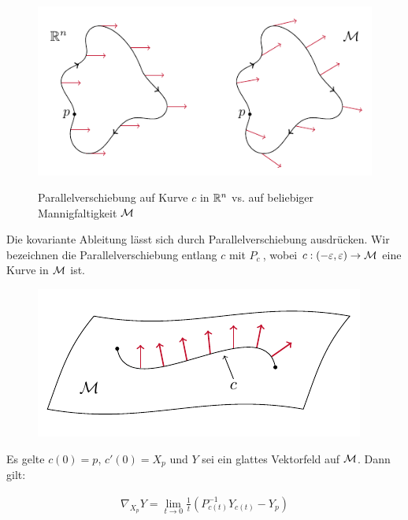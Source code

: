
\begin{figure}[H]
\centering
\includegraphics[width=0.7\linewidth]{figures/tikz/parallelshift_rn_vs_manifold.pdf}
\label{img:parallelshift_rn_vs_manifold}
\caption{Parallelverschiebung auf Kurve $c$ in $\mathbb{R}^n$ vs. auf beliebiger Mannigfaltigkeit $\mathcal{M}$}
\end{figure} 

Die kovariante Ableitung lässt sich durch Parallelverschiebung ausdrücken.
Wir bezeichnen die Parallelverschiebung entlang $c$ mit $P_c \ $, wobei $c: (-\varepsilon , \varepsilon) \to \mathcal{M}$ eine Kurve in $\mathcal{M}$ ist.
\begin{figure}[H]
\centering
\includegraphics[width=0.5\linewidth]{figures/tikz/parallel_shift_on_curve.pdf}
\label{img:parallel_shift_on_curve}
\end{figure} 
Es gelte $c(0)=p$, $c'(0) = X_p$ und $Y$ sei ein glattes Vektorfeld auf $\mathcal{M}$.
Dann gilt:

\begin{align}
\label{eq:parallelcovd}
\nabla_{X_p} Y = \lim\limits_{t \rightarrow 0} \frac{1}{t} \left( P^{-1}_{c(t)} Y_{c(t)} - Y_p\right) 
\end{align}

